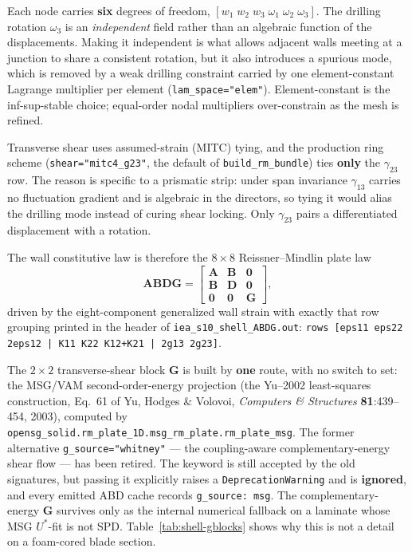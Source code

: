 Each node carries \textbf{six} degrees of freedom,
$[w_1\;w_2\;w_3\;\omega_1\;\omega_2\;\omega_3]$. The drilling rotation
$\omega_3$ is an \emph{independent} field rather than an algebraic function of the
displacements. Making it independent is what allows adjacent walls meeting at a
junction to share a consistent rotation, but it also introduces a spurious mode,
which is removed by a weak drilling constraint carried by one element-constant
Lagrange multiplier per element (\texttt{lam\_space="elem"}). Element-constant is
the inf-sup-stable choice; equal-order nodal multipliers over-constrain as the
mesh is refined.

Transverse shear uses assumed-strain (MITC) tying, and the production ring scheme
(\texttt{shear="mitc4\_g23"}, the default of \texttt{build\_rm\_bundle}) ties
\textbf{only} the $\gamma_{23}$ row. The reason is specific to a prismatic strip:
under span invariance $\gamma_{13}$ carries no fluctuation gradient and is
algebraic in the directors, so tying it would alias the drilling mode instead of
curing shear locking. Only $\gamma_{23}$ pairs a differentiated displacement with
a rotation.

The wall constitutive law is therefore the $8\times8$ Reissner--Mindlin plate law
\begin{equation}
\mathbf{ABDG} =
\begin{bmatrix}
\mathbf{A} & \mathbf{B} & \mathbf{0}\\
\mathbf{B} & \mathbf{D} & \mathbf{0}\\
\mathbf{0} & \mathbf{0} & \mathbf{G}
\end{bmatrix},
\label{eq:shell-abdg}
\end{equation}
driven by the eight-component generalized wall strain
with exactly that row grouping printed in the header of
\texttt{iea\_s10\_shell\_ABDG.out}:
\texttt{rows [eps11 eps22 2eps12 | K11 K22 K12+K21 | 2g13 2g23]}.

The $2\times2$ transverse-shear block $\mathbf{G}$ is built by \textbf{one}
route, with no switch to set: the MSG/VAM second-order-energy projection (the
Yu--2002 least-squares construction, Eq.~61 of Yu, Hodges \& Volovoi,
\emph{Computers \& Structures} \textbf{81}:439--454, 2003), computed by
\texttt{opensg\_solid.rm\_plate\_1D.msg\_rm\_plate.rm\_plate\_msg}. The former
alternative \texttt{g\_source="whitney"} --- the coupling-aware
complementary-energy shear flow --- has been retired. The keyword is still
accepted by the old signatures, but passing it explicitly raises a
\texttt{DeprecationWarning} and is \textbf{ignored}, and every emitted ABD cache
records \texttt{g\_source: msg}. The complementary-energy $\mathbf{G}$ survives
only as the internal numerical fallback on a laminate whose MSG $U^*$-fit is not
SPD. Table~\ref{tab:shell-gblocks} shows why this is not a detail on a
foam-cored blade section.

